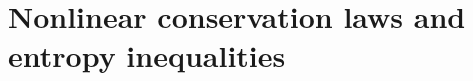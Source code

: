\documentclass{elsarticle}
\theoremstyle{definition}
\theoremstyle{plain}
\theoremstyle{plain}
\begin{document}











\section{Nonlinear conservation laws and entropy inequalities}\label{sec:section_2}
\end{document}

